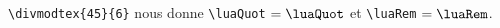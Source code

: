 \documentclass[border = 3pt]{standalone}
\begin{document}
%
%
\verb+\divmodtex{45}{6}+ nous donne
\verb+\luaQuot+ $= \luaQuot$
et
\verb+\luaRem+  $= \luaRem$.
\end{document}

